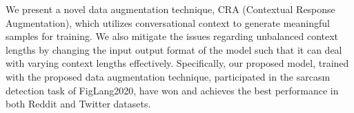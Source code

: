 We present a novel data augmentation technique, CRA (Contextual Response Augmentation), which utilizes conversational context to generate meaningful samples for training. We also mitigate the issues regarding unbalanced context lengths by changing the input output format of the model such that it can deal with varying context lengths effectively. Specifically, our proposed model, trained with the proposed data augmentation technique, participated in the sarcasm detection task of FigLang2020, have won and achieves the best performance in both Reddit and Twitter datasets.

